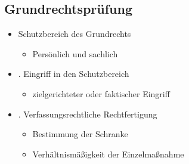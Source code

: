 \subsection{Grundrechtsprüfung}
\begin{itemize}
    \item Schutzbereich des Grundrechts
        \begin{itemize}
            \item Persönlich und sachlich
        \end{itemize}
    \item . Eingriff in den Schutzbereich
        \begin{itemize}
            \item  zielgerichteter oder faktischer Eingriff
        \end{itemize}
            \item . Verfassungsrechtliche Rechtfertigung
        \begin{itemize}
            \item Bestimmung der Schranke
            \item Verhältnismäßigkeit der Einzelmaßnahme
    \end{itemize}
\end{itemize}
